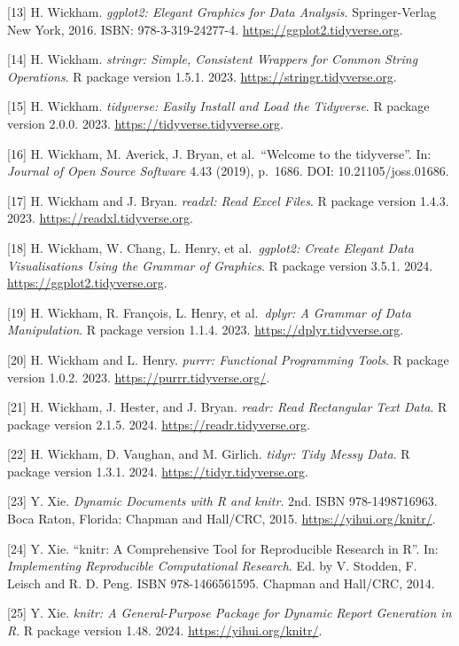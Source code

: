 \documentclass[
  letterpaper,
  DIV=11,
  numbers=noendperiod]{scrreprt}
\begin{document}
{[}13{]} H. Wickham. \emph{ggplot2: Elegant Graphics for Data Analysis}.
Springer-Verlag New York, 2016. ISBN: 978-3-319-24277-4.
\url{https://ggplot2.tidyverse.org}.

{[}14{]} H. Wickham. \emph{stringr: Simple, Consistent Wrappers for
Common String Operations}. R package version 1.5.1. 2023.
\url{https://stringr.tidyverse.org}.

{[}15{]} H. Wickham. \emph{tidyverse: Easily Install and Load the
Tidyverse}. R package version 2.0.0. 2023.
\url{https://tidyverse.tidyverse.org}.

{[}16{]} H. Wickham, M. Averick, J. Bryan, et al.~``Welcome to the
tidyverse''. In: \emph{Journal of Open Source Software} 4.43 (2019),
p.~1686. DOI: 10.21105/joss.01686.

{[}17{]} H. Wickham and J. Bryan. \emph{readxl: Read Excel Files}. R
package version 1.4.3. 2023. \url{https://readxl.tidyverse.org}.

{[}18{]} H. Wickham, W. Chang, L. Henry, et al.~\emph{ggplot2: Create
Elegant Data Visualisations Using the Grammar of Graphics}. R package
version 3.5.1. 2024. \url{https://ggplot2.tidyverse.org}.

{[}19{]} H. Wickham, R. François, L. Henry, et al.~\emph{dplyr: A
Grammar of Data Manipulation}. R package version 1.1.4. 2023.
\url{https://dplyr.tidyverse.org}.

{[}20{]} H. Wickham and L. Henry. \emph{purrr: Functional Programming
Tools}. R package version 1.0.2. 2023.
\url{https://purrr.tidyverse.org/}.

{[}21{]} H. Wickham, J. Hester, and J. Bryan. \emph{readr: Read
Rectangular Text Data}. R package version 2.1.5. 2024.
\url{https://readr.tidyverse.org}.

{[}22{]} H. Wickham, D. Vaughan, and M. Girlich. \emph{tidyr: Tidy Messy
Data}. R package version 1.3.1. 2024. \url{https://tidyr.tidyverse.org}.

{[}23{]} Y. Xie. \emph{Dynamic Documents with R and knitr}. 2nd. ISBN
978-1498716963. Boca Raton, Florida: Chapman and Hall/CRC, 2015.
\url{https://yihui.org/knitr/}.

{[}24{]} Y. Xie. ``knitr: A Comprehensive Tool for Reproducible Research
in R''. In: \emph{Implementing Reproducible Computational Research}. Ed.
by V. Stodden, F. Leisch and R. D. Peng. ISBN 978-1466561595. Chapman
and Hall/CRC, 2014.

{[}25{]} Y. Xie. \emph{knitr: A General-Purpose Package for Dynamic
Report Generation in R}. R package version 1.48. 2024.
\url{https://yihui.org/knitr/}.
\end{document}
